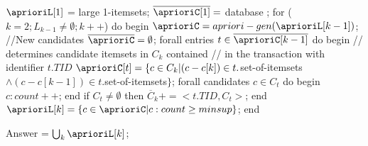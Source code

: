 $\aprioriL[1]$ = {large 1-itemsets};
$\overline{\aprioriC[1]} = $ database \D;
for ($k = 2; L_{k-1}\neq\emptyset; k++$) do begin
	$\aprioriC = apriori-gen(\aprioriL[k-1])$;  //New candidates
	$\overline{\aprioriC} = \emptyset$;
	forall entries $t\in \overline{\aprioriC[k-1]}$ do begin
		// determines candidate itemsets in $C_k$ contained
    // in the transaction with identifier $t.TID$
		$\aprioriC[t] =\{c\in C_k|(c-c[k])\in t.$set-of-itemsets $\wedge (c-c[k-1])\in t.$set-of-itemsets$\}$;
		forall candidates $c\in C_t$ do begin
			$c:count++$;
		end
		if $C_t\neq\emptyset$ then
			$\overline{C}_k += <t.TID,C_t>$;		
	end
	$\aprioriL[k] = \{c\in \aprioriC | c:count \geq minsup\}$;
end

Answer = $\bigcup_k{\aprioriL[k]}$;
